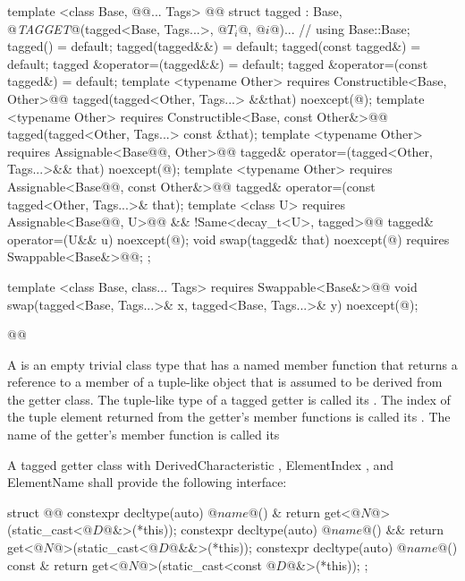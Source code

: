 {\begin{codeblock}
{  template <class Base, @@... Tags>
    @@
  struct tagged :
    Base, @\textit{TAGGET}@(tagged<Base, Tags...>, @$T_i$@, @$i$@)... { // \seebelow
    using Base::Base;
    tagged() = default;
    tagged(tagged&&) = default;
    tagged(const tagged&) = default;
    tagged &operator=(tagged&&) = default;
    tagged &operator=(const tagged&) = default;
    template <typename Other>
      requires Constructible<Base, Other>@\newtxt{()}@
    tagged(tagged<Other, Tags...> &&that) noexcept(@\seebelow@);
    template <typename Other>
      requires Constructible<Base, const Other&>@\newtxt{()}@
    tagged(tagged<Other, Tags...> const &that);
    template <typename Other>
      requires Assignable<Base@\newtxt{\&}@, Other>@\newtxt{()}@
    tagged& operator=(tagged<Other, Tags...>&& that) noexcept(@\seebelow@);
    template <typename Other>
      requires Assignable<Base@\newtxt{\&}@, const Other&>@\newtxt{()}@
    tagged& operator=(const tagged<Other, Tags...>& that);
    template <class U>
      requires Assignable<Base@\newtxt{\&}@, U>@\newtxt{()}@ && !Same<decay_t<U>, tagged>@\newtxt{()}@
    tagged& operator=(U&& u) noexcept(@\seebelow@);
    void swap(tagged& that) noexcept(@\seebelow@)
      requires Swappable<Base&>@\newtxt{()}@;
  };

  template <class Base, class... Tags>
    requires Swappable<Base&>@\newtxt{()}@
  void swap(tagged<Base, Tags...>& x, tagged<Base, Tags...>& y) noexcept(@\seebelow@);
}@\newtxt{\}\}}@
\end{codeblock}

\pnum {}

\pnum A  is an empty trivial class type that has a named member function that
returns a reference to a member of a tuple-like object that is assumed to be derived from the getter
class. The tuple-like type of a tagged getter is called its .
The index of the tuple element returned from the getter's member functions is called its
. The name of the getter's member function is called its

\pnum A tagged getter class with DerivedCharacteristic , ElementIndex
, and ElementName  shall provide the following interface:

\begin{codeblock}
struct @@ {
  constexpr decltype(auto) @$name$@() &       { return get<@$N$@>(static_cast<@$D$@&>(*this)); }
  constexpr decltype(auto) @$name$@() &&      { return get<@$N$@>(static_cast<@$D$@&&>(*this)); }
  constexpr decltype(auto) @$name$@() const & { return get<@$N$@>(static_cast<const @$D$@&>(*this)); }
};
\end{codeblock}

}
